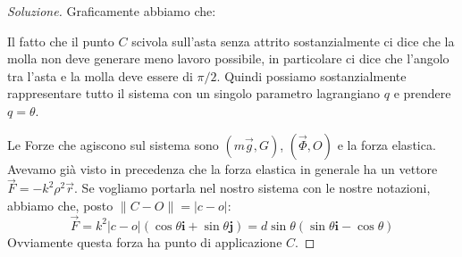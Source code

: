 \documentclass[11pt,a4paper,twoside]{article}
\theoremstyle{definition}
\newenvironment{sol}
	{\renewcommand\qedsymbol{$\blacksquare$}\begin{proof}[Soluzione]}
	{\end{proof}}
\begin{document}
\begin{sol}
	Graficamente abbiamo che:
	\begin{center}
	\end{center}
	Il fatto che il punto $C$ scivola sull'asta senza attrito sostanzialmente ci dice che la molla non deve generare meno lavoro possibile, in particolare ci dice che l'angolo tra l'asta e la molla deve essere di $\pi/2$. Quindi possiamo sostanzialmente rappresentare tutto il sistema con un singolo parametro lagrangiano $q$ e prendere $q = \theta$.

	Le Forze che agiscono sul sistema sono $(m\vec g, G)$, $(\vec \Phi, O)$ e la forza elastica. Avevamo già visto in precedenza che la forza elastica in generale ha un vettore $\vec F = -k^2\rho^2 \vec r$. Se vogliamo portarla nel nostro sistema con le nostre notazioni, abbiamo che, posto $\|C-O\| = |c-o|$:
	\[ \vec F = k^2|c-o|(\cos \theta \mathbf i + \sin \theta \mathbf j) = d \sin \theta(\sin \theta \mathbf i - \cos \theta) \]
	Ovviamente questa forza ha punto di applicazione $C$.


\end{sol}
\end{document}
